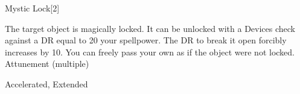 \begin{spellsection}{Mystic Lock}[2]
\begin{spellcontent}
\begin{spelltargetinginfo}
\end{spelltargetinginfo}
\begin{spelleffects}
\spelleffect
The target object is magically locked.
It can be unlocked with a Devices check against a DR equal to 20 \add your spellpower.
The DR to break it open forcibly increases by 10.
You can freely pass your own  as if the object were not locked.
\spelldur Attunement (multiple)
\end{spelleffects}
\end{spellcontent}
\begin{spellfooter}
 Accelerated, Extended
\end{spellfooter}
\begin{spellsubcontent}
\end{spellsubcontent}
\end{spellsection}
